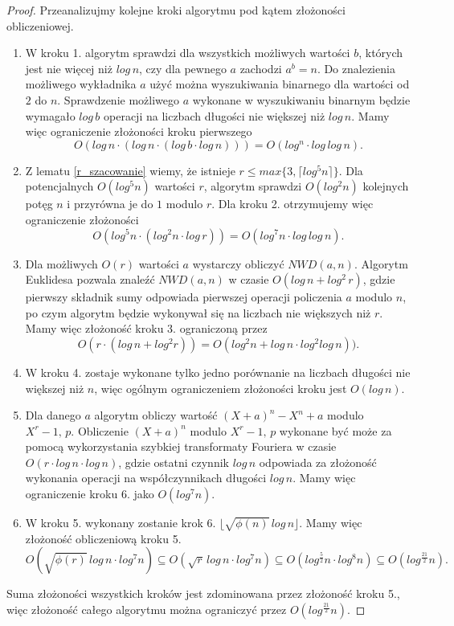 \documentclass[polish,declaration,shortabstract]{iithesis}
\theoremstyle{definition}
\theoremstyle{remark} \newtheorem{observation}{Obserwacja}
\theoremstyle{plain} \newtheorem{theorem}{Twierdzenie}
\theoremstyle{plain} \newtheorem{lemma}{Lemat}
\theoremstyle{remark} \newtheorem*{remark*}{Uwaga}
\theoremstyle{reminder} \newtheorem*{reminder*}{Przypomnienie}
\begin{document}
\begin{proof}
	Przeanalizujmy kolejne kroki algorytmu pod kątem złożoności obliczeniowej.
	\begin{enumerate}[label=(krok \arabic*.),leftmargin=.4in]
		\item W kroku 1. algorytm sprawdzi dla wszystkich możliwych wartości $b$, których jest nie więcej niż $log\,n$, czy dla pewnego $a$ zachodzi $a^b = n$. Do znalezienia możliwego wykładnika $a$ użyć można wyszukiwania binarnego dla wartości od $2$ do $n$. Sprawdzenie możliwego $a$ wykonane w wyszukiwaniu binarnym będzie wymagało $log \, b$ operacji na liczbach długości nie większej niż $log \, n$. Mamy więc ograniczenie złożoności kroku pierwszego \[O(log \, n \cdot (log \,n \cdot (log \,b \cdot log \,n ))) = O(log^n \cdot log \, log \, n).\]
		\item Z lematu \ref{r_szacowanie} wiemy, że istnieje $r \leq max\{3, \lceil log^5n \rceil \}$. Dla potencjalnych $O(log^5n)$ wartości $r$, algorytm sprawdzi $O(log^2n)$ kolejnych potęg $n$ i przyrówna je do $1$ modulo $r$. Dla kroku 2. otrzymujemy więc ograniczenie złożoności \[O(log^5n \cdot (log^2n \cdot log \,r)) = O(log^7n \cdot log\,log \,n).\]
		\item Dla możliwych $O(r)$ wartości $a$ wystarczy obliczyć $NWD(a, n)$. Algorytm Euklidesa pozwala znaleźć $NWD(a, n)$ w czasie $O(log \,n + log ^2 \, r)$, gdzie pierwszy składnik sumy odpowiada pierwszej operacji policzenia $a$ modulo $n$, po czym algorytm będzie wykonywał się na liczbach nie większych niż $r$. Mamy więc złożoność kroku 3. ograniczoną przez \[O(r \cdot (log \, n + log^2r)) = O(log^2n + log\,n \cdot log^2log \, n)).\] 
		\item W kroku 4. zostaje wykonane tylko jedno porównanie na liczbach długości nie większej niż $n$, więc ogólnym ograniczeniem złożoności kroku jest $O(log\,n)$.
		\item Dla danego $a$ algorytm obliczy wartość $(X + a)^n - X^n + a$ modulo $X^r - 1, \, p$. Obliczenie $(X + a)^n$ modulo $X^r - 1, \, p$ wykonane być może za pomocą wykorzystania szybkiej transformaty Fouriera w czasie $O(r \cdot log \, n \cdot log \, n)$, gdzie ostatni czynnik $log \, n$ odpowiada za złożoność wykonania operacji na współczynnikach długości $log \, n$. Mamy więc ograniczenie kroku 6. jako $O(log^7n)$.
		      \addtocounter{enumi}{-2}
		\item W kroku 5. wykonany zostanie krok 6. $\lfloor \sqrt{\phi(n)} \, log \, n \rfloor$. Mamy więc złożoność obliczeniową kroku 5. \[O(\sqrt{\phi(r)} \, log \, n \cdot log^7n) \subseteq O(\sqrt{r} \, log \, n \cdot log^7n) \subseteq O(log^{\frac{5}{2}}n \cdot log^8n) \subseteq O(log^{\frac{21}{2}}n).\]
	\end{enumerate}				
	Suma złożoności wszystkich kroków jest zdominowana przez złożoność kroku 5., więc złożoność całego algorytmu można ograniczyć przez $O(log^{\frac{21}{2}}n)$.
\end{proof}
	
\end{document}
